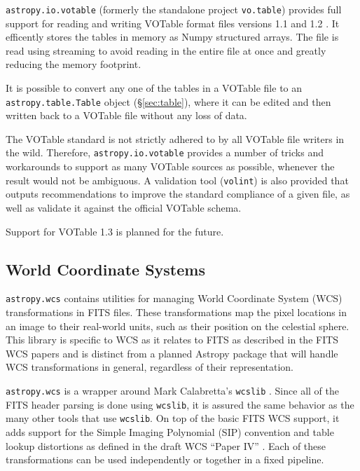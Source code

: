 \documentclass[traditabstract]{aa}
\begin{document}
\texttt{astropy.io.votable} (formerly the standalone project
\texttt{vo.table}) provides full support for reading and writing
VOTable format files versions 1.1 and 1.2
\citep{ochsenbein2004votable,ochsenbein2009votable}.  It efficently
stores the tables in memory as Numpy structured arrays.  The file is
read using streaming to avoid reading in the entire file at once and
greatly reducing the memory footprint.

It is possible to convert any one of the tables in a VOTable file to
an \texttt{astropy.table.Table} object (\S\ref{sec:table}), where it
can be edited and then written back to a VOTable file without any loss
of data.

The VOTable standard is not strictly adhered to by all VOTable file
writers in the wild.  Therefore, \texttt{astropy.io.votable} provides
a number of tricks and workarounds to support as many VOTable sources
as possible, whenever the result would not be ambiguous.  A validation
tool (\texttt{volint}) is also provided that outputs recommendations
to improve the standard compliance of a given file, as well as
validate it against the official VOTable schema.

Support for VOTable 1.3 is planned for the future.

\subsection{World Coordinate Systems}


\texttt{astropy.wcs} contains utilities for managing World Coordinate
System (WCS) transformations in FITS files.  These transformations map
the pixel locations in an image to their real-world units, such as
their position on the celestial sphere.  This library is specific to
WCS as it relates to FITS as described in the FITS WCS papers
\citep{greisen2002wcs,calabretta2002wcs,greisen2006wcs} and is
distinct from a planned Astropy package that will handle WCS
transformations in general, regardless of their representation.

\texttt{astropy.wcs} is a wrapper around Mark Calabretta's
\texttt{wcslib} \citep{calabretta2013wcslib}.  Since all of the FITS
header parsing is done using \texttt{wcslib}, it is assured the same
behavior as the many other tools that use \texttt{wcslib}.  On top of
the basic FITS WCS support, it adds support for the Simple Imaging
Polynomial (SIP) convention and table lookup distortions as defined in
the draft WCS ``Paper IV'' \citep{calabretta2004wcs}.  Each of these
transformations can be used independently or together in a fixed
pipeline.
\end{document}
